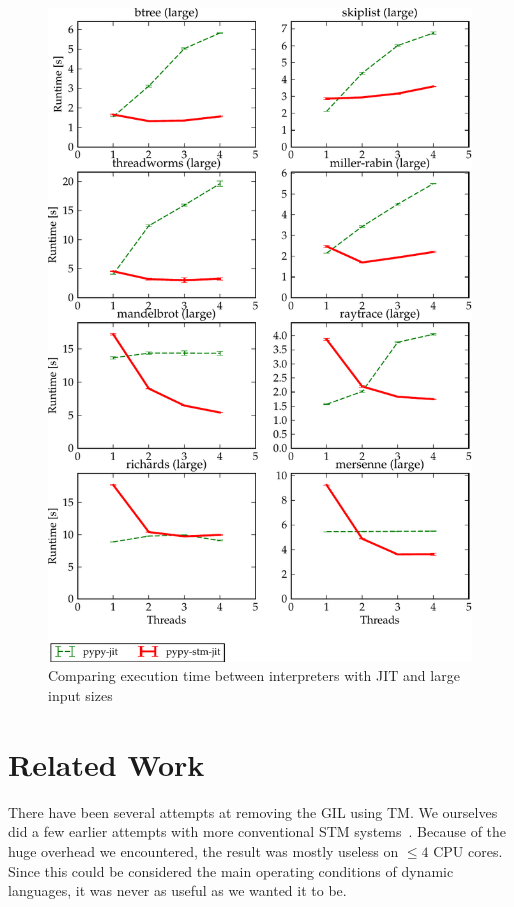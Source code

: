 \documentclass{sigplanconf}
\begin{document}
\begin{figure}[h]
  \centering
  \includegraphics[width=1\columnwidth]{plots/performance.pdf}
  \caption{Comparing execution time between interpreters with JIT
    and large input sizes\label{fig:performance-jit}}
\end{figure}


\vspace{3mm} %
\section{Related Work}

There have been several attempts at removing the GIL using TM. We
ourselves did a few earlier attempts with more conventional STM
systems~\cite{stmupdate13}. Because of the huge overhead we
encountered, the result was mostly useless on $\le 4$ CPU cores.
Since this could be considered the main operating conditions of
dynamic languages, it was never as useful as we wanted it to be.
\end{document}
